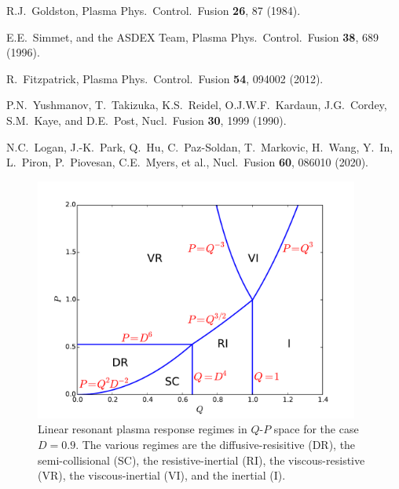 \documentclass[12pt,prb,aps]{revtex4-1}
\begin{document}
\begin{thebibliography}{99}
 R.J.~Goldston, Plasma Phys.\ Control.\ Fusion {\bf 26}, 87 (1984).

 E.E.~Simmet, and the ASDEX Team, Plasma Phys.\ Control.\ Fusion {\bf 38}, 689 (1996).

 R.~Fitzpatrick, Plasma Phys.\ Control.\ Fusion {\bf 54}, 094002 (2012).

 P.N.~Yushmanov, T.~Takizuka, K.S.~Reidel, O.J.W.F.~Kardaun, J.G.~Cordey, S.M.~Kaye,
and D.E.~Post, Nucl.\ Fusion {\bf 30}, 1999 (1990).

 N.C.~Logan, J.-K.~Park, Q.~Hu, C.~Paz-Soldan, T.~Markovic, H.~Wang,
Y.~In, L.~Piron, P.~Piovesan, C.E.~Myers, et al., Nucl.\ Fusion {\bf 60}, 086010 (2020).

\end{thebibliography}

\newpage 
\begin{figure}
\centerline{\includegraphics[width=0.95\textwidth]{Figure1.pdf}}
\caption{Linear resonant plasma response regimes in $Q$-$P$ space for the case $D=0.9$. The various regimes are
the diffusive-resisitive (DR), the semi-collisional (SC), the resistive-inertial (RI), the viscous-resistive (VR), the viscous-inertial
(VI), and the inertial (I).}\label{f1}
\end{figure}
\end{document}
